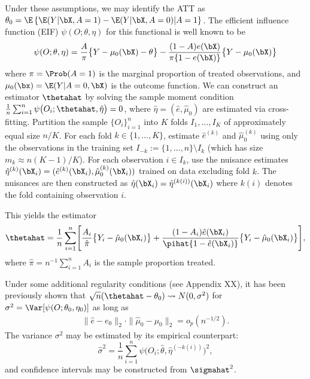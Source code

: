 \documentclass[12pt]{article}
\begin{document}
Under these assumptions, we may identify the ATT as $\theta_0 = \E\left\{\E(Y | \bX, A = 1) - \E(Y | \bX, A = 0) | A = 1 \right\}$. The efficient influence function (EIF) $\psi(O; \theta, \eta)$ for this functional is well known to be
\begin{equation}
\label{eq:score}
\psi(O; \theta, \eta) = \frac{A}{\pi}\bigl\{ Y - \mu_0(\bX) - \theta \bigr\} - \frac{(1-A)e(\bX)}{\pi\{1 - e(\bX)\}} \bigl\{ Y - \mu_0(\bX) \bigr\}
\end{equation}
where $\pi = \Prob(A=1)$ is the marginal proportion of treated observations, and $\mu_0(\bx) = \E(Y | A = 0, \bX)$ is the outcome function. We can construct an estimator $\thetahat$ by solving the sample moment condition $\frac{1}{n} \sum_{i=1}^n \psi\bigl(O_i; \thetahat, \hat\eta\bigr) = 0$,
where $\hat\eta = (\hat{e}, \hat{\mu}_0)$ are estimated via cross-fitting. Partition the sample $\{O_i\}_{i=1}^n$ into $K$ folds $I_1, \ldots, I_K$ of approximately equal size $n/K$. For each fold $k \in \{1,\ldots,K\}$, estimate $\hat{e}^{(k)}$ and $\hat{\mu}_0^{(k)}$ using only the observations in the training set $I_{-k} := \{1,\ldots,n\} \setminus I_k$ (which has size $m_k \approx n(K-1)/K$). For each observation $i \in I_k$, use the nuisance estimates $\hat\eta^{(k)}(\bX_i) = (\hat{e}^{(k)}(\bX_i), \hat{\mu}_0^{(k)}(\bX_i))$ trained on data excluding fold $k$. The nuisances are then constructed as $\hat\eta(\bX_i) = \hat\eta^{(k(i))}(\bX_i)$ where $k(i)$ denotes the fold containing observation $i$.

This yields the estimator
\begin{equation}
\label{eq:att-estimator}
\thetahat = \frac{1}{n} \sum_{i=1}^n \Biggl[ \frac{A_i}{\hat\pi}\bigl\{ Y_i - \hat\mu_0(\bX_i) \bigr\} + \frac{(1-A_i)\hat{e}(\bX_i)}{\pihat\{1 - \hat{e}(\bX_i)\}} \bigl\{ Y_i - \hat\mu_0(\bX_i) \bigr\} \Biggr],
\end{equation}
where $\hat\pi = n^{-1}\sum_{i=1}^n A_i$ is the sample proportion treated.

Under some additional regularity conditions (see Appendix XX), it has been previously shown \cite{chernozhukov2018, kennedy2016semiparametric} that $\sqrt{n}(\thetahat - \theta_0) \leadsto N(0, \sigma^2)$ for $\sigma^2 = \Var[\psi(O; \theta_0, \eta_0)]$ as long as 
\begin{align*}
\label{eq:product-rate}
\|\hat{e} - e_0\|_2 \cdot \|\hat{\mu}_0 - \mu_0\|_{2} = o_p(n^{-1/2}).
\end{align*}
The variance $\sigma^2$ may be estimated by its empirical counterpart: \begin{equation}
\hat\sigma^2 = \frac{1}{n} \sum_{i=1}^n \psi\bigl(O_i; \hat\theta, \hat\eta^{(-k(i))}\bigr)^2,
\end{equation}
and confidence intervals may be constructed from $\sigmahat^2$.
\end{document}
